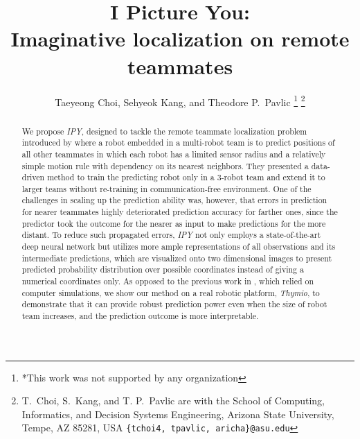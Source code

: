 \documentclass[letterpaper, 10 pt, conference]{ieeeconf}  %
\title{\LARGE \bf
	I Picture You: \\
	Imaginative localization on remote teammates
}
\author{Taeyeong Choi, Sehyeok Kang, and Theodore P.~Pavlic %
	\thanks{*This work was not supported by any organization}%
	\thanks{T.~Choi, S.~Kang, and T. P.~Pavlic are with the School of Computing, Informatics, and Decision Systems Engineering,
		Arizona State University, Tempe, AZ 85281, USA
		{\tt\small \{tchoi4, tpavlic, aricha\}@asu.edu}}%
}
\begin{document}
	
	
	
	\maketitle
	\thispagestyle{empty}
	\pagestyle{empty}
	
	
	\begin{abstract}
		
%		
%		

		We propose \emph{IPY}, designed to tackle the remote teammate localization problem
		introduced 
		by \cite{Choi17} where a robot embedded in a multi-robot team is to predict positions 
		of all other teammates in which each robot has a limited sensor radius and a 
		relatively simple motion rule with dependency on its nearest neighbors. 
		They presented a data-driven method to train the predicting robot only in 
		a 3-robot team and extend it to larger teams without re-training in 
		communication-free environment. 
		One of the challenges in scaling up the prediction ability was, however, that
		errors in prediction for nearer teammates highly deteriorated prediction accuracy 
		for farther ones, since the predictor took the outcome for the nearer as input to make
		predictions for the more distant. 
		To reduce such propagated errors, \emph{IPY} not only employs a state-of-the-art deep
		neural network but utilizes more ample representations of all observations and its 
		intermediate predictions, which are visualized onto two dimensional images to 
		present predicted probability distribution over possible coordinates instead of 
		giving a numerical coordinates only. 
		As opposed to the previous work in \cite{Choi17}, which relied on computer simulations, 
		we show our method on a real robotic platform, \emph{Thymio}, to demonstrate that 
		it can provide robust prediction power even when the size of robot team increases, and 
		the prediction outcome is more interpretable.  
		

\end{abstract}
\end{document}

